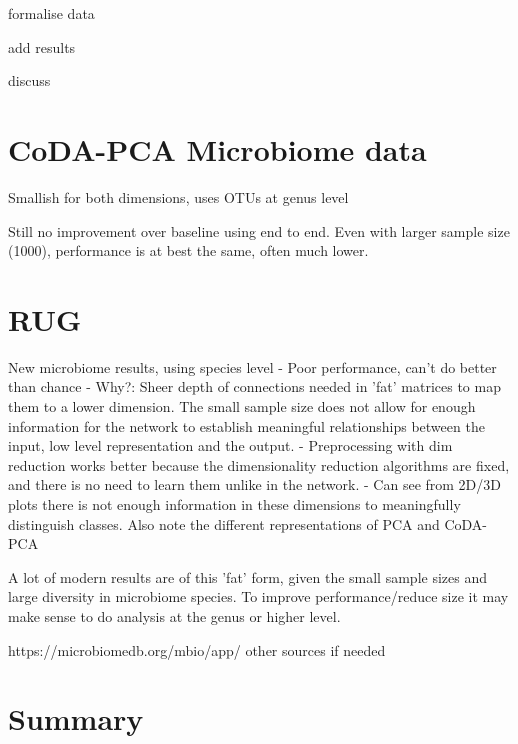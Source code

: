 formalise data

add results 

discuss




\section{CoDA-PCA Microbiome data}
Smallish for both dimensions, uses OTUs at genus level

Still no improvement over baseline using end to end. Even with larger sample size (1000), performance is at best the same, often much lower.  

\section{RUG}
New microbiome results, using species level  
- Poor performance, can't do better than chance
- Why?: Sheer depth of connections needed in 'fat' matrices to map them to a lower dimension. The small sample size does not allow for enough information for the network to establish meaningful relationships between the input, low level representation and the output. 
- Preprocessing with dim reduction works better because the dimensionality reduction algorithms are fixed, and there is no need to learn them unlike in the network.
- Can see from 2D/3D plots there is not enough information in these dimensions to meaningfully distinguish classes. Also note the different representations of PCA and CoDA-PCA

A lot of modern results are of this 'fat' form, given the small sample sizes and large diversity in microbiome species. To improve performance/reduce size it may make sense to do analysis at the genus or higher level. 

https://microbiomedb.org/mbio/app/ other sources if needed





\section{Summary}
